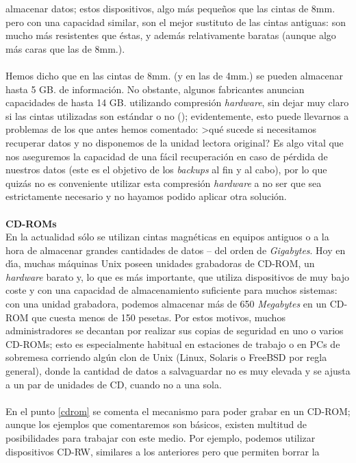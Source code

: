 almacenar datos; estos dispositivos, algo m\'as peque\~nos que las cintas de
8mm. pero con una capacidad similar, son el mejor sustituto de las cintas
antiguas: son mucho m\'as resistentes que \'estas, y adem\'as relativamente
baratas (aunque algo m\'as caras que las de 8mm.).\\
\\Hemos dicho que en las cintas de 8mm. (y en las de 4mm.) se pueden almacenar 
hasta 5 GB. de informaci\'on. No obstante, algunos fabricantes 
anuncian capacidades de hasta 14 GB. utilizando compresi\'on {\it hardware}, 
sin dejar muy claro si las cintas utilizadas son est\'andar o no 
(\cite{kn:fri95}); evidentemente, esto puede llevarnos a problemas de los que
antes hemos comentado: >qu\'e sucede si necesitamos recuperar datos y no 
disponemos de la unidad lectora original? Es algo vital que nos aseguremos la
capacidad de una f\'acil recuperaci\'on en caso de p\'erdida de nuestros datos
(este es el objetivo de los {\it backups} al fin y al cabo), por lo que 
quiz\'as no es conveniente utilizar esta compresi\'on {\it hardware} a no ser 
que sea estrictamente necesario y no hayamos podido aplicar otra soluci\'on.\\
\\{\bf CD-ROMs}\\
En la actualidad s\'olo se utilizan cintas magn\'eticas en equipos antiguos
o a la hora de almacenar grandes cantidades de datos -- del orden de {\it
Gigabytes}. Hoy en d\'{\i}a, muchas m\'aquinas Unix poseen unidades grabadoras
de CD-ROM, un {\it hardware} barato y, lo que es m\'as importante, que utiliza
dispositivos de muy bajo coste y con una capacidad de almacenamiento suficiente
para muchos sistemas: con una unidad grabadora, podemos almacenar m\'as de 650
{\it Megabytes} en un CD-ROM que cuesta menos de 150 pesetas. Por estos motivos,
muchos administradores se decantan por realizar sus copias de seguridad en uno
o varios CD-ROMs; esto es especialmente habitual en estaciones de trabajo o en
PCs de sobremesa corriendo alg\'un clon de Unix (Linux, Solaris o FreeBSD por
regla general), donde la cantidad de datos a salvaguardar no es muy elevada y
se ajusta a un par de unidades de CD, cuando no a una sola.\\
\\En el punto \ref{cdrom} se comenta el mecanismo para poder grabar en un
CD-ROM; aunque los ejemplos que comentaremos son b\'asicos, existen multitud
de posibilidades para trabajar con este medio. Por ejemplo, podemos utilizar
dispositivos CD-RW, similares a los anteriores pero que permiten borrar la
